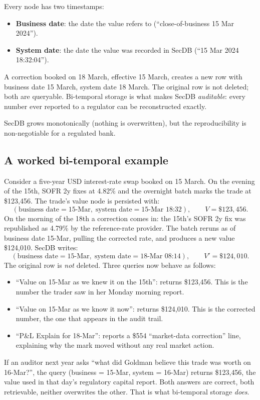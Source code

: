 \begin{keyfactbox}
Every node has two timestamps:
\begin{itemize}
  \item \textbf{Business date}: the date the value refers to
    (``close-of-business 15 Mar 2024'').
  \item \textbf{System date}: the date the value was recorded in
    SecDB (``15 Mar 2024 18:32:04'').
\end{itemize}
A correction booked on 18 March, effective 15 March, creates a new
row with business date 15 March, system date 18 March.  The
original row is not deleted; both are queryable.  Bi-temporal
storage is what makes SecDB \emph{auditable}: every number ever
reported to a regulator can be reconstructed exactly.
\end{keyfactbox}

SecDB grows monotonically (nothing is overwritten), but the
reproducibility is non-negotiable for a regulated bank.

\subsection{A worked bi-temporal example}
\label{sec:bitemporal_example}

Consider a five-year USD interest-rate swap booked on 15 March.
On the evening of the 15th, SOFR 2y fixes at 4.82\% and the
overnight batch marks the trade at \$123{,}456.  The trade's value
node is persisted with:
\[
  (\text{business date} = \text{15-Mar},\;
   \text{system date} = \text{15-Mar 18:32}),\qquad
  V = \$123{,}456.
\]
On the morning of the 18th a correction comes in: the 15th's SOFR
2y fix was republished as 4.79\% by the reference-rate provider.
The batch reruns as of business date 15-Mar, pulling the corrected
rate, and produces a new value \$124{,}010.  SecDB writes:
\[
  (\text{business date} = \text{15-Mar},\;
   \text{system date} = \text{18-Mar 08:14}),\qquad
  V' = \$124{,}010.
\]
The original row is \emph{not} deleted.  Three queries now behave
as follows:
\begin{itemize}
  \item ``Value on 15-Mar as we knew it on the 15th'': returns
    \$123{,}456.  This is the number the trader saw in her Monday
    morning report.
  \item ``Value on 15-Mar as we know it now'': returns \$124{,}010.
    This is the corrected number, the one that appears in the
    audit trail.
  \item ``P\&L Explain for 18-Mar'': reports a \$554 ``market-data
    correction'' line, explaining why the mark moved without any
    real market action.
\end{itemize}
If an auditor next year asks ``what did Goldman believe this
trade was worth on 16-Mar?'', the query (business = 15-Mar,
system = 16-Mar) returns \$123{,}456, the value used in that
day's regulatory capital report.  Both answers are correct, both
retrievable, neither overwrites the other.  That is what
bi-temporal storage \emph{does}.


